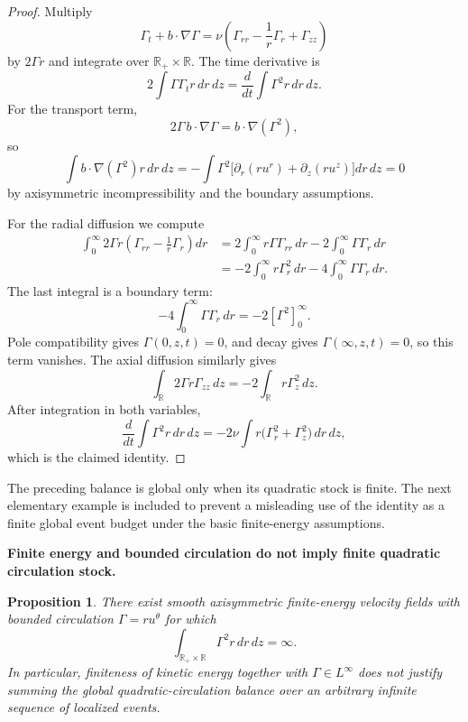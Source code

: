 \documentclass[11pt]{article}
\newtheorem{proposition}[theorem]{Proposition}
\theoremstyle{definition}\newtheorem{definition}[theorem]{Definition}
\theoremstyle{remark}\newtheorem{remark}[theorem]{Remark}
\newcommand{\R}{\mathbb R}\newcommand{\dd}{\,d}\newcommand{\HH}{\mathcal H}
\begin{document}
\begin{proof}
Multiply
\[
 \Gamma_t+b\cdot\nabla\Gamma
 =\nu\left(\Gamma_{rr}-\frac1r\Gamma_r+\Gamma_{zz}\right)
\]
by $2\Gamma r$ and integrate over $\R_+\times\R$.
The time derivative is
\[
 2\int \Gamma\Gamma_t r\,dr\,dz
 =\frac{d}{dt}\int \Gamma^2r\,dr\,dz.
\]
For the transport term,
\[
 2\Gamma\,b\cdot\nabla\Gamma=b\cdot\nabla(\Gamma^2),
\]
so
\[
 \int b\cdot\nabla(\Gamma^2)r\,dr\,dz
 =-\int \Gamma^2
 \bigl[\partial_r(ru^r)+\partial_z(ru^z)\bigr]dr\,dz=0
\]
by axisymmetric incompressibility and the boundary assumptions.

For the radial diffusion we compute
\[
 \begin{aligned}
 \int_0^\infty 2\Gamma r
 \left(\Gamma_{rr}-\frac1r\Gamma_r\right)dr
 &=2\int_0^\infty r\Gamma\Gamma_{rr}\,dr
   -2\int_0^\infty\Gamma\Gamma_r\,dr\\
 &=-2\int_0^\infty r\Gamma_r^2\,dr
   -4\int_0^\infty\Gamma\Gamma_r\,dr.
 \end{aligned}
\]
The last integral is a boundary term:
\[
 -4\int_0^\infty\Gamma\Gamma_r\,dr
 =-2[\Gamma^2]_{0}^{\infty}.
\]
Pole compatibility gives $\Gamma(0,z,t)=0$, and decay gives $\Gamma(\infty,z,t)=0$, so this term vanishes.  The axial diffusion similarly gives
\[
 \int_{\R}2\Gamma r\Gamma_{zz}\,dz
 =-2\int_{\R}r\Gamma_z^2\,dz.
\]
After integration in both variables,
\[
 \frac{d}{dt}\int\Gamma^2r\,dr\,dz
 =-2\nu\int r\bigl(\Gamma_r^2+\Gamma_z^2\bigr)\,dr\,dz,
\]
which is the claimed identity.
\end{proof}

The preceding balance is global only when its quadratic stock is finite.  The next
elementary example is included to prevent a misleading use of the identity as a
finite global event budget under the basic finite-energy assumptions.

\medskip
\noindent\textbf{Finite energy and bounded circulation do not imply finite quadratic circulation stock.}
\begin{proposition}\label{prop:infinite-circulation-stock}
There exist smooth axisymmetric finite-energy velocity fields with bounded circulation
\(\Gamma=ru^\theta\) for which
\[
 \int_{\mathbb R_+\times\mathbb R}\Gamma^2 r\,dr\,dz=\infty.
\]
In particular, finiteness of kinetic energy together with \(\Gamma\in L^\infty\)
does not justify summing the global quadratic-circulation balance over an
arbitrary infinite sequence of localized events.
\end{proposition}
\end{document}
